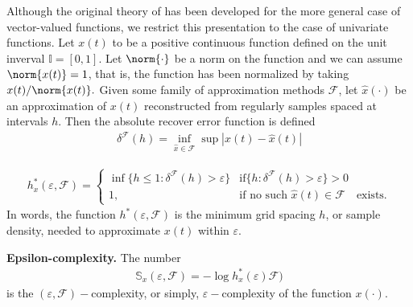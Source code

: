 \documentclass[11pt ]{article}
\begin{document}
   Although the original theory of 
  has been developed for the more general case of vector-valued 
  functions, we restrict this presentation to the case of 
  univariate functions.
  Let $x(t)$ to be a positive continuous function defined on the 
  unit inverval $ \mathbb{I} = [0,1]$. Let $\norm{\cdot}$ be a norm on the function and we can assume $\norm{x(t)} = 1$, that is, the function has been normalized 
  by taking $x(t)/\norm{x(t)}.$ Given some family of approximation 
  methods $\mathcal{F}$, let $\hat x(\cdot)$ be an approximation
  of $x(t)$ reconstructed from regularly samples spaced at intervals $h$. Then the absolute recover error function is defined 
  \begin{align}
    \delta^{\mathcal{F}}(h) = \inf_{\hat x \in \mathcal{F}} 
    \sup | x(t) - \hat x(t)|
  \end{align}

  \begin{align*}
    h_x^*(\varepsilon, \mathcal{F}) = \begin{cases}
      \inf \{ h \leq 1 : \delta^{\mathcal{F}}(h) > \varepsilon \} & \text{if} 
      \{ h : \delta^{\mathcal{F}}(h) > \varepsilon \} > 0  \\ 
        1, &  \text{if no such } \hat x(t) \in \mathcal{F} \hspace{1em}\text{exists.}
    \end{cases}
  \end{align*}
  In words, the function $h^*(\varepsilon, \mathcal{F})$ is the minimum grid spacing $h$, or sample density, needed to approximate $x(t)$ within $\varepsilon$. 
  \begin{defn}{\textbf{Epsilon-complexity.} }\label{def:ecomplexity}
  The number
  \begin{align}
    \mathbb{S}_x(\varepsilon, \mathcal{F}) =  
    -\log h_x^*(\varepsilon) 
    \mathcal{F})
  \end{align}
  is the $(\varepsilon, \mathcal{F})-$complexity, 
  or simply, $\varepsilon-$complexity of the function $x(\cdot)$. 
  \end{defn}
\end{document}
